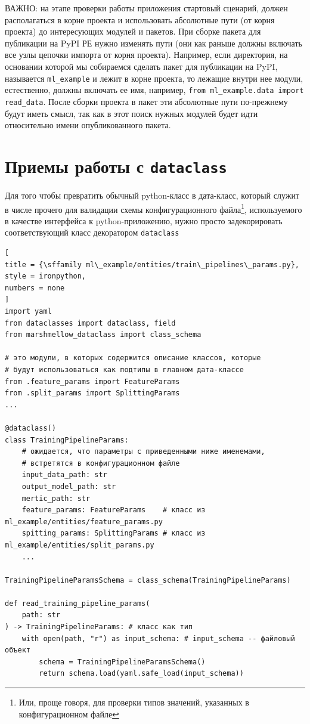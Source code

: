 \documentclass[%
	11pt,
	a4paper,
	utf8,
		]{article}
\begin{document}
ВАЖНО: на этапе проверки работы приложения стартовый сценарий, должен располагаться в корне проекта и использовать абсолютные пути (от корня проекта) до интересующих модулей и пакетов. При сборке пакета для публикации на PyPI РЕ нужно изменять пути (они как раньше должны включать все узлы цепочки импорта от корня проекта). Например, если директория, на основании которой мы собираемся сделать пакет для публикации на PyPI, называется \texttt{ml\_example} и лежит в корне проекта, то лежащие внутри нее модули, естественно, должны включать ее имя, например, \texttt{from ml\_example.data import read\_data}. После сборки проекта в пакет эти абсолютные пути по-прежнему будут иметь смысл, так как в этот поиск нужных модулей будет идти относительно имени опубликованного пакета.


\section{Приемы работы с \texttt{dataclass}}

Для того чтобы превратить обычный python-класс в дата-класс, который служит в числе прочего для валидации схемы конфигурационного файла\footnote{Или, проще говоря, для проверки типов значений, указанных в конфигурационном файле}, используемого в качестве интерфейса к python-приложению, нужно просто задекорировать соответствующий класс декоратором \texttt{dataclass}
\begin{lstlisting}[
title = {\sffamily ml\_example/entities/train\_pipelines\_params.py},
style = ironpython,
numbers = none	
]
import yaml
from dataclasses import dataclass, field
from marshmellow_dataclass import class_schema

# это модули, в которых содержится описание классов, которые
# будут использоваться как подтипы в главном дата-классе
from .feature_params import FeatureParams
from .split_params import SplittingParams
...

@dataclass()
class TrainingPipelineParams:
    # ожидается, что параметры с приведенными ниже именемами,
    # встретятся в конфигурационном файле
    input_data_path: str 
    output_model_path: str
    mertic_path: str
    feature_params: FeatureParams    # класс из ml_example/entities/feature_params.py
    spitting_params: SplittingParams # класс из ml_example/entities/split_params.py
    ...
    
TrainingPipelineParamsSchema = class_schema(TrainingPipelineParams)

def read_training_pipeline_params(
    path: str
) -> TrainingPipelineParams: # класс как тип
    with open(path, "r") as input_schema: # input_schema -- файловый объект
        schema = TrainingPipelineParamsSchema()
        return schema.load(yaml.safe_load(input_schema))
\end{lstlisting}
\end{document}
